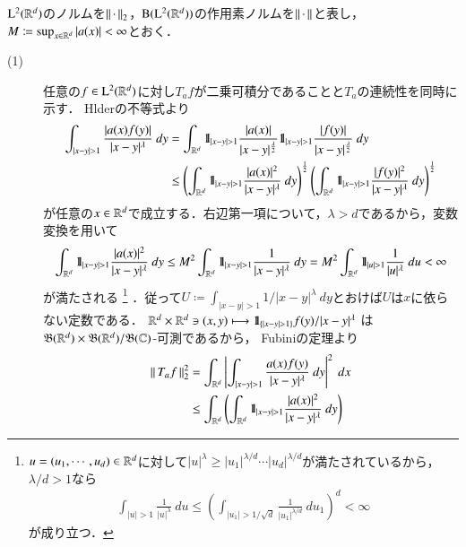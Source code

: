	\begin{prf} $\mathrm{L}^2(\mathbb{R}^d)$のノルムを$\left\|\, \cdot\, \right\|_{2}$，$\mathrm{B}(\mathrm{L}^2(\mathbb{R}^d)) $の作用素ノルムを$\left\|\, \cdot\, \right\|_{}$と表し，
		$M \coloneqq \operatorname*{sup}_{x \in \mathbb{R}^d} |a(x)| < \infty$とおく．
		\begin{description}
			\item[(1)] 
				任意の$f \in \mathrm{L}^2(\mathbb{R}^d)$に対し$T_a f$が二乗可積分であることと$T_a$の連続性を同時に示す．
				Hlderの不等式より
				\begin{align}
					\int_{|x-y| > 1} \frac{|a(x)f(y)|}{|x-y|^\lambda}\ dy
					&= \int_{\mathbb{R}^d} \mbox{1}\hspace{-0.25em}\mbox{l}_{|x-y| > 1} \frac{|a(x)|}{|x-y|^{\frac{\lambda}{2}}} \mbox{1}\hspace{-0.25em}\mbox{l}_{|x-y| > 1} \frac{|f(y)|}{|x-y|^{\frac{\lambda}{2}}}\ dy \\
					&\leq \left( \int_{\mathbb{R}^d} \mbox{1}\hspace{-0.25em}\mbox{l}_{|x-y| > 1} \frac{|a(x)|^2}{|x-y|^{\lambda}}\ dy \right)^{\frac{1}{2}}
						\left( \int_{\mathbb{R}^d} \mbox{1}\hspace{-0.25em}\mbox{l}_{|x-y| > 1} \frac{|f(y)|^2}{|x-y|^{\lambda}}\ dy \right)^{\frac{1}{2}}
					\label{eq:report_6_4}
				\end{align}
				が任意の$x \in \mathbb{R}^d$で成立する．右辺第一項について，$\lambda > d$であるから，変数変換を用いて
				\begin{align}
					\int_{\mathbb{R}^d} \mbox{1}\hspace{-0.25em}\mbox{l}_{|x-y| > 1} \frac{|a(x)|^2}{|x-y|^{\lambda}}\ dy
					\leq M^2 \int_{\mathbb{R}^d} \mbox{1}\hspace{-0.25em}\mbox{l}_{|x-y| > 1} \frac{1}{|x-y|^{\lambda}}\ dy
					= M^2 \int_{\mathbb{R}^d} \mbox{1}\hspace{-0.25em}\mbox{l}_{|u| > 1} \frac{1}{|u|^\lambda}\ du < \infty
				\end{align}
				が満たされる
				\footnote{
					$u = (u_1,\cdots,u_d) \in \mathbb{R}^d$に対して$|u|^\lambda \geq |u_1|^{\lambda/d} \cdots |u_d|^{\lambda/d}$が満たされているから，
					$\lambda/d > 1$なら
					\begin{align}
						\int_{|u| > 1} \frac{1}{|u|^\lambda}\ du
						\leq \left( \int_{|u_1| > 1/\sqrt{d}} \frac{1}{|u_1|^{\lambda/d}}\ du_1 \right)^d
						< \infty
					\end{align}
					が成り立つ．
				}
				．従って$U \coloneqq \int_{|x - y| > 1} 1/|x-y|^{\lambda}\ dy$とおけば$U$は$x$に依らない定数である．
				$\R^d \times \R^d \ni (x,y) \longmapsto \defunc_{\left\{|x-y|>1\right\}} f(y)/|x-y|^\lambda$
				は$\mathfrak{B}(\mathbb{R}^d) \times \mathfrak{B}(\mathbb{R}^d)/\mathfrak{B}(\mathbb{C})$-可測であるから，
				Fubiniの定理より
				\begin{align}
					\Norm{T_a f}{2}^2
					&= \int_{\R^d} \left| \int_{|x-y| > 1} \frac{a(x)f(y)}{|x-y|^\lambda}\ dy \right|^2\ dx \\
					&\leq \int_{\R^d} \left( \int_{\R^d} \defunc_{|x-y| > 1} \frac{|a(x)|^2}{|x-y|^{\lambda}}\ dy \right)

\end{align}
\end{description}
\end{prf}
